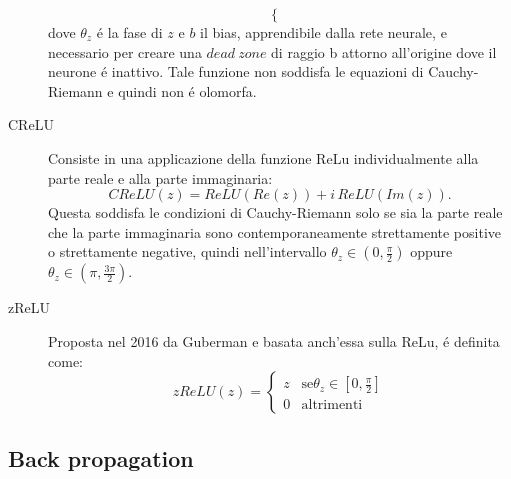 \documentclass[a4paper,10pt]{article}
\begin{document}
\begin{description}
\begin{equation}
\begin{cases}
                                                                \end{cases}
 \end{equation}
 dove $\theta_z$ \'e la fase di $z$ e $b$ il bias, apprendibile dalla rete neurale, e necessario per creare una $dead \ zone$ di raggio b attorno all'origine dove il neurone \'e inattivo. Tale funzione non soddisfa le equazioni di Cauchy-Riemann e quindi non \'e olomorfa.
 
 \item[CReLU]
 Consiste in una applicazione della funzione ReLu individualmente alla parte reale e alla parte immaginaria:
 \begin{equation}
  CReLU\left( z\right) = ReLU\left( Re\left( z\right)\right) + i \, ReLU\left( Im\left( z\right)\right).
 \end{equation}
 Questa soddisfa le condizioni di Cauchy-Riemann solo se sia la parte reale che la parte immaginaria sono contemporaneamente strettamente positive o strettamente negative, quindi nell'intervallo $\theta_z \in \left( 0, \frac{\pi}{2}\right)$ oppure $\theta_z \in \left( \pi, \frac{ 3 \pi}{2}\right)$.
 
 \item[zReLU]
 Proposta nel 2016 da Guberman e basata anch'essa sulla ReLu, \'e definita come:
 \begin{equation}
   zReLU\left( z\right) = \begin{cases}
                                                                                               z & \mbox{se} \theta_z \in \left[ 0, \frac{ \pi}{2}\right] \\
                                                                                0 & \mbox{altrimenti}
                                                             
                                                     \end{cases}
 \end{equation}

\end{description}
 
 \subsection{Back propagation}
 
\end{document}

